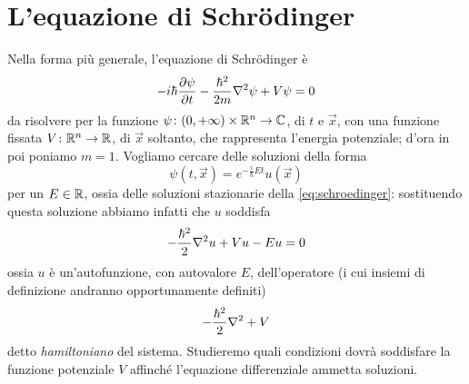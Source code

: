 \chapter{L'equazione di Schrödinger}
\label{ch:schroedinger}

Nella forma più generale, l'equazione di Schrödinger è
\begin{equation}
    -i\hbar\frac{\partial {\psi}}{\partial {t}}-\frac{\hbar^2}{2m}\nabla^2\psi+V\psi=0
    \label{eq:schroedinger}
\end{equation}
da risolvere per la funzione $\psi\colon(0,+\infty)\times\mathbb{R}^n\to\mathbb{C}$, di $t$ e $\vec x$, con una funzione fissata $V\colon\mathbb{R}^n\to\mathbb{R}$, di $\vec x$ soltanto, che rappresenta l'energia potenziale; d'ora in poi poniamo $m=1$.
Vogliamo cercare delle soluzioni della forma
\begin{equation}
    \psi(t,\vec x)=e^{-\frac{i}{\hbar}Et}u(\vec x)
    \label{eq:soluzione-stazionaria-schroedinger}
\end{equation}
per un $E\in\mathbb{R}$, ossia delle soluzioni stazionarie della \eqref{eq:schroedinger}: sostituendo questa soluzione abbiamo infatti che $u$ soddisfa
\begin{equation}
    -\frac{\hbar^2}{2}\nabla^2 u+Vu-Eu=0
    \label{eq:schroedinger-stazionaria}
\end{equation}
ossia $u$ è un'autofunzione, con autovalore $E$, dell'operatore (i cui insiemi di definizione andranno opportunamente definiti)
\begin{equation}
    -\frac{\hbar^2}{2}\nabla^2+V
    \label{eq:operatore-hamiltoniano}
\end{equation}
detto \emph{hamiltoniano} del sistema.
Studieremo quali condizioni dovrà soddisfare la funzione potenziale $V$ affinch\'e l'equazione differenziale ammetta soluzioni.
